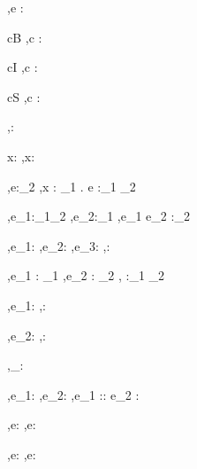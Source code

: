 




  {\Gamma,\Sigma \infers e : \tau}


  {c\in B}
  {\Gamma,\Sigma\infers c : \Bool}

  {c\in I}
  {\Gamma,\Sigma\infers c : \Int}

  {c\in S}
  {\Gamma,\Sigma\infers c : \String}


  { }
  {\Gamma,\Sigma\infers \unit : \Unit}


  {x:\tau\in\Gamma}
  {\Gamma,\Sigma\infers x:\tau}


  {\Gamma[x:\tau_1] ,\Sigma \infers e:\tau_2}
  {\Gamma,\Sigma \infers \lambda x : \tau_1 . e :\tau_1 \to \tau_2}

  {\Gamma,\Sigma \infers e_1:\tau_1\to\tau_2 \Quad
   \Gamma,\Sigma \infers e_2:\tau_1}
  {\Gamma,\Sigma \infers e_1 e_2 :\tau_2}


  {\Gamma,\Sigma \infers e_1:\Bool \Quad
   \Gamma,\Sigma \infers e_2:\tau \Quad
   \Gamma,\Sigma \infers e_3:\tau}
  {\Gamma,\Sigma \infers {}:\tau}


    {\Gamma,\Sigma \infers e_1 : \tau_1  \Quad
     \Gamma,\Sigma \infers e_2 : \tau_2}
    {\Gamma,\Sigma \infers {} :\tau_1 \times \tau_2}

  {\Gamma,\Sigma\infers e_1:\tau}
  {\Gamma,\Sigma\infers \Fst {}:\tau}

    {\Gamma,\Sigma\infers e_2:\tau}
    {\Gamma,\Sigma\infers \Snd {}:\tau}

  { }
  {\Gamma,\Sigma\infers [\ ]_\beta : \List\beta}

  {\Gamma,\Sigma\infers e_1:\beta \Quad
   \Gamma,\Sigma\infers e_2:\List\beta}
  {\Gamma,\Sigma\infers e_1 :: e_2 : \List \beta}

  {\Gamma,\Sigma\infers e:\List\beta}
  {\Gamma,\Sigma\infers \Head e:\beta}

    {\Gamma,\Sigma\infers e:\List\beta}
    {\Gamma,\Sigma\infers \Tail e:\List\beta}



